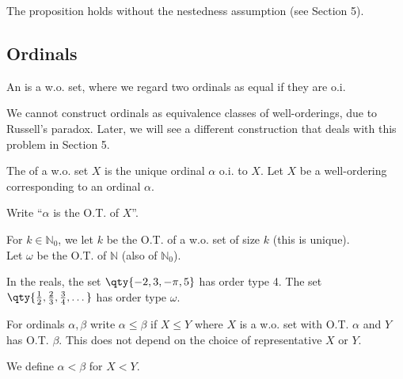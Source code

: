 \begin{remark}
    The proposition holds without the nestedness assumption (see Section 5).
\end{remark}

\subsection{Ordinals}
\begin{definition}[Ordinal]
    An  is a w.o. set, where we regard two ordinals as equal if they are o.i.
\end{definition}

\begin{remark}
    We cannot construct ordinals as equivalence classes of well-orderings, due to Russell's paradox.
    Later, we will see a different construction that deals with this problem in Section 5.
\end{remark}

\begin{definition}
    The  of a w.o. set $X$ is the unique ordinal $\alpha$ o.i. to $X$.
    Let $X$ be a well-ordering corresponding to an ordinal $\alpha$.
\end{definition}

\begin{notation}
    Write ``$\alpha$ is the O.T. of $X$''.
\end{notation}

\begin{example}
    For $k \in \mathbb{N}_0$, we let $k$ be the O.T. of a w.o. set of size $k$ (this is unique). \\
    Let $\omega$ be the O.T. of $\mathbb{N}$ (also of $\mathbb{N}_0$).
\end{example}

\begin{example}
    In the reals, the set $\qty{-2, 3, -\pi, 5}$ has order type 4.
    The set $\qty{\frac{1}{2}, \frac{2}{3}, \frac{3}{4}, \dots}$ has order type $\omega$.
\end{example}

\begin{note}
    For ordinals $\alpha, \beta$ write $\alpha \leq \beta$ if $X \leq Y$ where $X$ is a w.o. set with O.T. $\alpha$ and $Y$ has O.T. $\beta$.
    This does not depend on the choice of representative $X$ or $Y$.

    We define $\alpha < \beta$ for $X < Y$.
\end{note}

